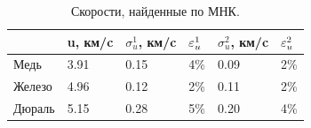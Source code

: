\documentclass[a4paper,12pt]{article}
\numberwithin{equation}{section}
\begin{document}
\begin{enumerate}
\begin{table} [H] \center
\begin{tabular}{l|lll|ll}
&u, км/c&$\sigma^1_u$, км/c&$\varepsilon^1_u$&$\sigma^2_u$, км/c&$\varepsilon^2_u$\\
\hline
Медь&3.91&0.15&4\%&0.09&2\%\\
Железо&4.96&0.12&2\%&0.11&2\%\\
Дюраль&5.15&0.28&5\%&0.20&4\%\\
\end{tabular}
\caption{Скорости, найденные по МНК.}
\label{table:8}
\end{table}



\end{enumerate}
\end{document}
